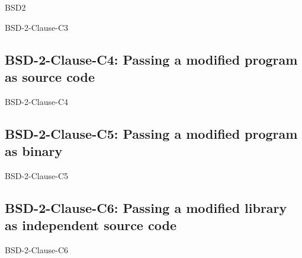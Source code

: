 \begin{license}{BSD2}
\begin{lsuc}{BSD-2-Clause-C3}
  \lsucmeans{\useCaseThree}
  \lsuccovers{\coversThree}

  \begin{lsucrequires}  
    \lsucmandatory{\insertLicenseIntoBinary}\passingFilesCorrectly
  \end{lsucrequires}

  \lsucprohibitsnothing
\end{lsuc}

\subsection{BSD-2-Clause-C4: Passing a modified program as source code}
\begin{lsuc}{BSD-2-Clause-C4}

  \lsucmeans{\useCaseFour}
  \lsuccovers{\coversFour}

  \begin{lsucrequires}
    \lsucmandatory{\keepLicenseElements}
    \lsucoptional{\addLicenseToCopyrightMessage}
  \end{lsucrequires}

  \lsucprohibitsnothing
\end{lsuc}

\subsection{BSD-2-Clause-C5: Passing a modified program as binary}
\begin{lsuc}{BSD-2-Clause-C5}

  \lsucmeans{\useCaseFive}
  \lsuccovers{\coversFive}

  \begin{lsucrequires}
    \lsucmandatory{\insertLicenseIntoBinary}\passingFilesCorrectly
    \lsucoptional{\addLicenseToCopyrightMessage}
  \end{lsucrequires}

  \lsucprohibitsnothing
\end{lsuc}

\subsection{BSD-2-Clause-C6: Passing a modified library as independent source code}
\begin{lsuc}{BSD-2-Clause-C6}


\end{lsuc}
\end{license}
